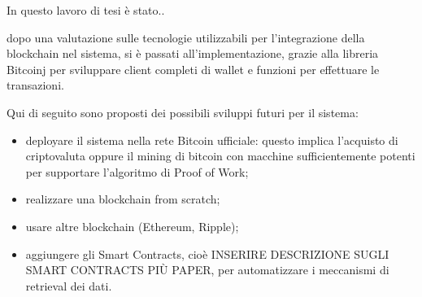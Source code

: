 In questo lavoro di tesi è stato..

dopo una valutazione sulle tecnologie utilizzabili per l'integrazione della blockchain nel sistema, si è passati all'implementazione, grazie alla libreria Bitcoinj per sviluppare client completi di wallet e funzioni per effettuare le transazioni.


Qui di seguito sono proposti dei possibili sviluppi futuri per il sistema: 
\begin{itemize}
    \item deployare il sistema nella rete Bitcoin ufficiale: questo implica l'acquisto di criptovaluta oppure il mining di bitcoin con macchine sufficientemente potenti per supportare l'algoritmo di Proof of Work;
    \item realizzare una blockchain from scratch;
    \item usare altre blockchain (Ethereum, Ripple);
    \item aggiungere gli Smart Contracts, cioè INSERIRE DESCRIZIONE SUGLI SMART CONTRACTS PIÙ PAPER, per automatizzare i meccanismi di retrieval dei dati.
\end{itemize}

